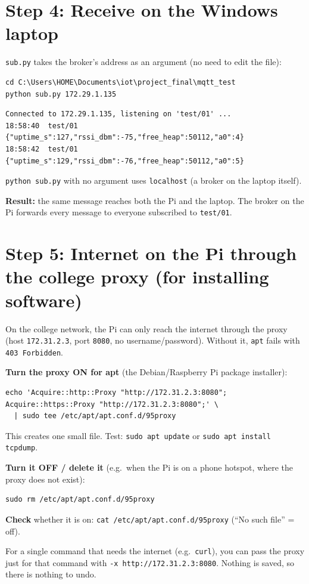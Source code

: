 \documentclass[11pt]{article}
\begin{document}
\section*{Step 4: Receive on the Windows laptop}
\texttt{sub.py} takes the broker's address as an argument (no need to edit the file):
\begin{verbatim}
cd C:\Users\HOME\Documents\iot\project_final\mqtt_test
python sub.py 172.29.1.135
\end{verbatim}
\begin{verbatim}
Connected to 172.29.1.135, listening on 'test/01' ...
18:58:40  test/01  {"uptime_s":127,"rssi_dbm":-75,"free_heap":50112,"a0":4}
18:58:42  test/01  {"uptime_s":129,"rssi_dbm":-76,"free_heap":50112,"a0":5}
\end{verbatim}
\texttt{python sub.py} with no argument uses \texttt{localhost} (a broker on the laptop itself).

\textbf{Result:} the same message reaches both the Pi and the laptop. The broker on the Pi forwards every message to everyone subscribed to \texttt{test/01}.

\newpage
\section*{Step 5: Internet on the Pi through the college proxy (for installing software)}
On the college network, the Pi can only reach the internet through the proxy (host \texttt{172.31.2.3}, port \texttt{8080}, no username/password).
Without it, \texttt{apt} fails with \texttt{403 Forbidden}.

\textbf{Turn the proxy ON for apt} (the Debian/Raspberry Pi package installer):
\begin{verbatim}
echo 'Acquire::http::Proxy "http://172.31.2.3:8080";
Acquire::https::Proxy "http://172.31.2.3:8080";' \
  | sudo tee /etc/apt/apt.conf.d/95proxy
\end{verbatim}
This creates one small file. Test: \texttt{sudo apt update} or \texttt{sudo apt install tcpdump}.

\textbf{Turn it OFF / delete it} (e.g.\ when the Pi is on a phone hotspot, where the proxy does not exist):
\begin{verbatim}
sudo rm /etc/apt/apt.conf.d/95proxy
\end{verbatim}
\textbf{Check} whether it is on: \texttt{cat /etc/apt/apt.conf.d/95proxy} (``No such file'' = off).

For a single command that needs the internet (e.g.\ \texttt{curl}), you can pass the proxy just for that command with \texttt{-x http://172.31.2.3:8080}.
Nothing is saved, so there is nothing to undo.
\end{document}
